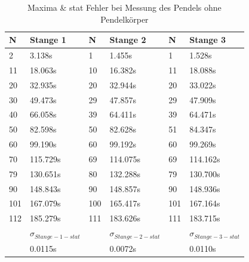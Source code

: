 \documentclass[twoside]{protokoll}
\begin{document}
\begin{table}[H]
    \centering
    \begin{tabularx}{1.0\textwidth}{X X X X X X}
       \textbf{N}  & \textbf{Stange 1} & \textbf{N} & \textbf{Stange 2} & \textbf{N} & \textbf{Stange 3} \\
       \toprule
       2 & 3.138s &  1 & 1.455s &  1 & 1.528s \\
       11 & 18.063s &  10 & 16.382s &  11 & 18.088s \\
       20 & 32.935s &  20 & 32.944s &  20 & 33.022s \\
       30 & 49.473s &  29 & 47.857s &  29 & 47.909s \\
       40 & 66.058s &  39 & 64.411s &  39 & 64.471s \\
       50 & 82.598s &  50 & 82.628s &  51 & 84.347s \\
       60 & 99.190s &  60 & 99.192s &  60 & 99.269s \\
       70 & 115.729s &  69 & 114.075s &  69 & 114.162s \\
       79 & 130.651s &  80 & 132.288s &  79 & 130.700s \\
       90 & 148.843s &  90 & 148.857s &  90 & 148.936s \\
       101 & 167.079s &  100 & 165.417s &  101 & 167.164s \\
       112 & 185.279s &  111 & 183.626s &  111 & 183.715s \\
       \midrule
        & \textbf{$\sigma_{Stange-1-stat}$} & & \textbf{$\sigma_{Stange-2-stat}$} & & \textbf{$\sigma_{Stange-3-stat}$} \\
       \midrule
        & 0.0115s & & 0.0072s & & 0.0110s \\
       \toprule
    \end{tabularx}
    \caption{Maxima \& stat Fehler bei Messung des Pendels ohne Pendelkörper}
\end{table}

 
 
\end{document}
